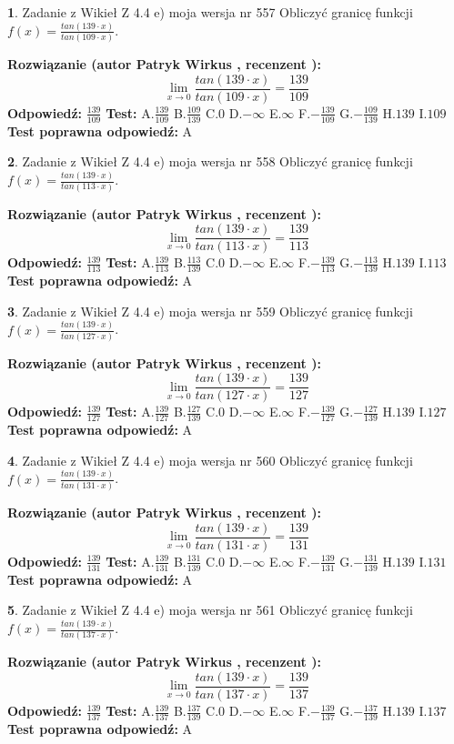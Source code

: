 \documentclass[12pt, a4paper]{article}
\theoremstyle{definition} %
\newtheorem{zad}{}
\newcommand{\zadStart}[1]{\begin{zad}#1\newline}
\newcommand{\zadStop}{\end{zad}}
\newcommand{\rozwStart}[2]{\noindent \textbf{Rozwiązanie (autor #1 , recenzent #2): }\newline}
\newcommand{\rozwStop}{\newline}
\newcommand{\odpStart}{\noindent \textbf{Odpowiedź:}\newline}
\newcommand{\odpStop}{\newline}
\newcommand{\testStart}{\noindent \textbf{Test:}\newline}
\newcommand{\testStop}{\newline}
\newcommand{\kluczStart}{\noindent \textbf{Test poprawna odpowiedź:}\newline}
\newcommand{\kluczStop}{\newline}
\begin{document}
\zadStart{Zadanie z Wikieł Z 4.4 e) moja wersja nr 557}
Obliczyć granicę funkcji $f(x)=\frac{tan(139\cdot x)}{tan(109\cdot x)}$.
\zadStop
\rozwStart{Patryk Wirkus}{}
$$\lim\limits_{x\to 0}\frac{tan(139\cdot x)}{tan(109\cdot x)}=
\frac{139}{109}$$
\rozwStop
\odpStart
$\frac{139}{109}$
\odpStop
\testStart
A.$\frac{139}{109}$
B.$\frac{109}{139}$
C.$0$
D.$-\infty$
E.$\infty$
F.$-\frac{139}{109}$
G.$-\frac{109}{139}$
H.$139$
I.$109$
\testStop
\kluczStart
A
\kluczStop



\zadStart{Zadanie z Wikieł Z 4.4 e) moja wersja nr 558}
Obliczyć granicę funkcji $f(x)=\frac{tan(139\cdot x)}{tan(113\cdot x)}$.
\zadStop
\rozwStart{Patryk Wirkus}{}
$$\lim\limits_{x\to 0}\frac{tan(139\cdot x)}{tan(113\cdot x)}=
\frac{139}{113}$$
\rozwStop
\odpStart
$\frac{139}{113}$
\odpStop
\testStart
A.$\frac{139}{113}$
B.$\frac{113}{139}$
C.$0$
D.$-\infty$
E.$\infty$
F.$-\frac{139}{113}$
G.$-\frac{113}{139}$
H.$139$
I.$113$
\testStop
\kluczStart
A
\kluczStop



\zadStart{Zadanie z Wikieł Z 4.4 e) moja wersja nr 559}
Obliczyć granicę funkcji $f(x)=\frac{tan(139\cdot x)}{tan(127\cdot x)}$.
\zadStop
\rozwStart{Patryk Wirkus}{}
$$\lim\limits_{x\to 0}\frac{tan(139\cdot x)}{tan(127\cdot x)}=
\frac{139}{127}$$
\rozwStop
\odpStart
$\frac{139}{127}$
\odpStop
\testStart
A.$\frac{139}{127}$
B.$\frac{127}{139}$
C.$0$
D.$-\infty$
E.$\infty$
F.$-\frac{139}{127}$
G.$-\frac{127}{139}$
H.$139$
I.$127$
\testStop
\kluczStart
A
\kluczStop



\zadStart{Zadanie z Wikieł Z 4.4 e) moja wersja nr 560}
Obliczyć granicę funkcji $f(x)=\frac{tan(139\cdot x)}{tan(131\cdot x)}$.
\zadStop
\rozwStart{Patryk Wirkus}{}
$$\lim\limits_{x\to 0}\frac{tan(139\cdot x)}{tan(131\cdot x)}=
\frac{139}{131}$$
\rozwStop
\odpStart
$\frac{139}{131}$
\odpStop
\testStart
A.$\frac{139}{131}$
B.$\frac{131}{139}$
C.$0$
D.$-\infty$
E.$\infty$
F.$-\frac{139}{131}$
G.$-\frac{131}{139}$
H.$139$
I.$131$
\testStop
\kluczStart
A
\kluczStop



\zadStart{Zadanie z Wikieł Z 4.4 e) moja wersja nr 561}
Obliczyć granicę funkcji $f(x)=\frac{tan(139\cdot x)}{tan(137\cdot x)}$.
\zadStop
\rozwStart{Patryk Wirkus}{}
$$\lim\limits_{x\to 0}\frac{tan(139\cdot x)}{tan(137\cdot x)}=
\frac{139}{137}$$
\rozwStop
\odpStart
$\frac{139}{137}$
\odpStop
\testStart
A.$\frac{139}{137}$
B.$\frac{137}{139}$
C.$0$
D.$-\infty$
E.$\infty$
F.$-\frac{139}{137}$
G.$-\frac{137}{139}$
H.$139$
I.$137$
\testStop
\kluczStart
A
\kluczStop
\end{document}
